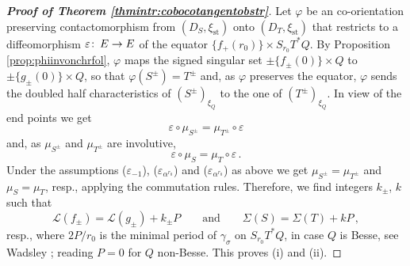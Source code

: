 \documentclass{amsart}
\theoremstyle{definition}
\def\co{\colon\thinspace}
\newcommand{\LLL}{\mathscr L}
\newcommand{\ra}{\rightarrow}
\DeclareMathOperator{\st}{\mathrm{st}}
\begin{document}
\begin{proof}[{\bf Proof of Theorem \ref{thmintr:cobocotangentobstr}}]
  Let $\varphi$ be an co-orientation
  preserving contactomorphism
  from $(D_S,\xi_{\st})$ onto $(D_T,\xi_{\st})$
  that restricts to a diffeomorphism
  $\varepsilon\co E\ra E$ of the equator
  $\{f_+(r_0)\}\times S_{r_0}T^*Q$.
  By Proposition \ref{prop:phiinvonchrfol},
  $\varphi$ maps the signed singular set
  $\pm\{f_{\pm}(0)\}\times Q$ to
  $\pm\{g_{\pm}(0)\}\times Q$,
  so that $\varphi(S^{\pm})=T^{\pm}$
  and, as $\varphi$ preserves the equator,
  $\varphi$ sends the doubled half characteristics of
  $(S^{\pm})_{\xi_Q}$ to the one of $(T^{\pm})_{\xi_Q}$.
  In view of the end points we get
  \[
  \varepsilon\circ\mu_{S^{\pm}}=
  \mu_{T^{\pm}}\circ\varepsilon
  \]
  and, as $\mu_{S^{\pm}}$ and $\mu_{T^{\pm}}$ are involutive,
  \[
  \varepsilon\circ\mu_S=
  \mu_T\circ\varepsilon
  \,.
  \]
  Under the assumptions
  ($\varepsilon_{-1}$), ($\varepsilon_{\alpha^{r_0}}$)
  and ($\varepsilon_{\alpha^{r_0}}$)
  as above we get
  $\mu_{S^{\pm}}=\mu_{T^{\pm}}$ and
  $\mu_S=\mu_T$, resp.,
  applying the commutation rules.
  Therefore,
  we find integers $k_{\pm}$, $k$ such that
  \[
  \LLL(f_{\pm})=\LLL(g_{\pm})+k_{\pm}P
  \qquad
  \text{and}
  \qquad
  \Sigma(S)=\Sigma(T)+kP
  \,,
  \]
  resp., where $2P/r_0$ is the minimal period
  of $\gamma_{\sigma}$ on $S_{r_0}T^*Q$,
  in case $Q$ is Besse,
  see Wadsley \cite{wad75};
  reading $P=0$ for $Q$ non-Besse.
  This proves (i) and (ii).
  

\end{proof}
\end{document}
